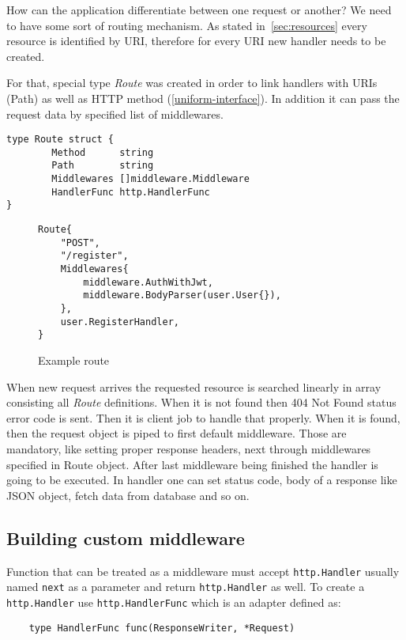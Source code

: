 How can the application differentiate between one request or another? We need to have some sort of routing mechanism. As stated in~\ref{sec:resources} every resource is identified by URI, therefore for every URI new handler needs to be created.

For that, special type \textit{Route} was created in order to link handlers with URIs (Path) as well as HTTP method (\ref{uniform-interface}). In addition it can pass the request data by specified list of middlewares.

\begin{verbatim}
type Route struct {
        Method      string
        Path        string
        Middlewares []middleware.Middleware
        HandlerFunc http.HandlerFunc
}
\end{verbatim}

\begin{figure}[!htbp]
\begin{verbatim}
Route{
    "POST",
    "/register",
    Middlewares{
        middleware.AuthWithJwt,
        middleware.BodyParser(user.User{}),
    },
    user.RegisterHandler,
}
\end{verbatim}
\renewcommand\figurename{Code}
\caption{Example route}
\label{src:example-route}
\end{figure}

When new request arrives the requested resource is searched linearly in array consisting all \textit{Route} definitions. When it is not found then 404 Not Found status error code is sent. Then it is client job to handle that properly. When it is found, then the request object is piped to first default middleware. Those are mandatory, like setting proper response headers, next through middlewares specified in Route object. After last middleware being finished the handler is going to be executed. In handler one can set status code, body of a response like JSON object, fetch data from database and so on.

\subsection{Building custom middleware}
Function that can be treated as a middleware must accept \verb|http.Handler| usually named \verb|next| as a parameter and return \verb|http.Handler| as well. To create a \verb|http.Handler| use \verb|http.HandlerFunc| which is an adapter\cite{HTTP-go} defined as:
\begin{verbatim}
    type HandlerFunc func(ResponseWriter, *Request)
\end{verbatim}

